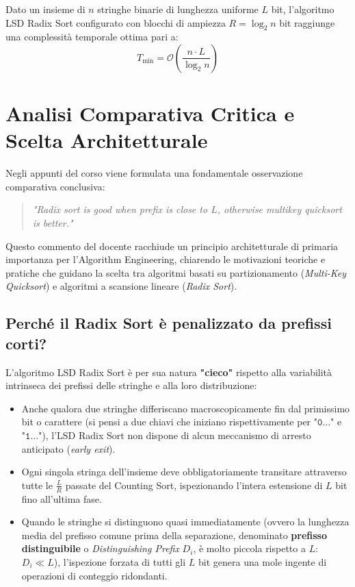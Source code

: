 \begin{theorem}
\label{thm:ottimo-radix-binario}
Dato un insieme di $n$ stringhe binarie di lunghezza uniforme $L$ bit, l'algoritmo LSD Radix Sort configurato con blocchi di ampiezza $R = \log_2 n$ bit raggiunge una complessit\`a temporale ottima pari a:
\begin{equation}
  T_{\text{min}} = \mathcal{O}\left( \frac{n \cdot L}{\log_2 n} \right)
\end{equation}
\end{theorem}

\FloatBarrier
\section{Analisi Comparativa Critica e Scelta Architetturale}
\label{sec:analisi-comparativa-stringhe}

Negli appunti del corso viene formulata una fondamentale osservazione comparativa conclusiva:
\begin{quote}
\textit{"Radix sort is good when prefix is close to $L$, otherwise multikey quicksort is better."}
\end{quote}
Questo commento del docente racchiude un principio architetturale di primaria importanza per l'Algorithm Engineering, chiarendo le motivazioni teoriche e pratiche che guidano la scelta tra algoritmi basati su partizionamento (\textit{Multi-Key Quicksort}) e algoritmi a scansione lineare (\textit{Radix Sort}).

\FloatBarrier
\subsection{Perché il Radix Sort è penalizzato da prefissi corti?}
\label{subsec:penalizzazione-radix-sort}

L'algoritmo LSD Radix Sort \`e per sua natura \textbf{"cieco"} rispetto alla variabilit\`a intrinseca dei prefissi delle stringhe e alla loro distribuzione:
\begin{itemize}
  \item Anche qualora due stringhe differiscano macroscopicamente fin dal primissimo bit o carattere (si pensi a due chiavi che iniziano rispettivamente per $\texttt{"0..."}$ e $\texttt{"1..."}$), l'LSD Radix Sort non dispone di alcun meccanismo di arresto anticipato (\textit{early exit}).
  \item Ogni singola stringa dell'insieme deve obbligatoriamente transitare attraverso tutte le $\frac{L}{R}$ passate del Counting Sort, ispezionando l'intera estensione di $L$ bit fino all'ultima fase.
  \item Quando le stringhe si distinguono quasi immediatamente (ovvero la lunghezza media del prefisso comune prima della separazione, denominato \textbf{prefisso distinguibile} o \textit{Distinguishing Prefix} $D_i$, \`e molto piccola rispetto a $L$: $D_i \ll L$), l'ispezione forzata di tutti gli $L$ bit genera una mole ingente di operazioni di conteggio ridondanti.
\end{itemize}

